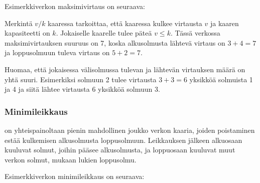 Esimerkkiverkon maksimivirtaus on seuraava:

\begin{center}
\end{center}

Merkintä $v/k$ kaaressa tarkoittaa,
että kaaressa kulkee virtausta $v$
ja kaaren kapasiteetti on $k$.
Jokaiselle kaarelle tulee päteä $v \le k$.
Tässä verkossa
maksimivirtauksen suuruus on 7, koska alkusolmusta
lähtevä virtaus on $3+4=7$ ja loppusolmuun
tuleva virtaus on $5+2=7$.

Huomaa, että jokaisessa välisolmussa tulevan ja
lähtevän virtauksen määrä on yhtä suuri.
Esimerkiksi solmuun 2 tulee virtausta $3+3=6$ yksikköä solmuista 1 ja 4
ja siitä lähtee virtausta $6$ yksikköä solmuun 3.

\subsubsection{Minimileikkaus}


 on yhteispainoltaan
pienin mahdollinen joukko verkon kaaria,
joiden poistaminen estää kulkemisen
alkusolmusta loppusolmuun.
Leikkauksen jälkeen alkuosaan kuuluvat
solmut, joihin pääsee alkusolmusta,
ja loppuosaan kuuluvat muut verkon solmut,
mukaan lukien loppusolmu.

Esimerkkiverkon minimileikkaus on seuraava:

